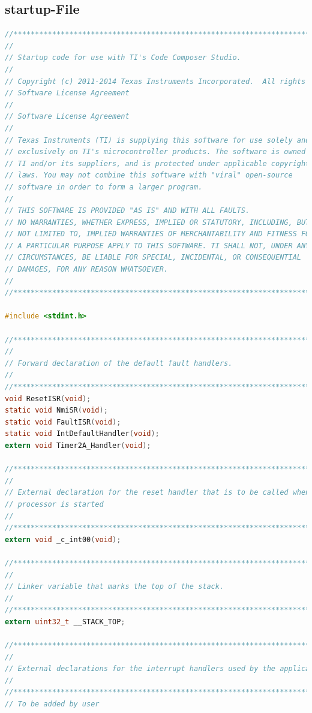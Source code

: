 \documentclass{article}
\begin{document}
\subsection*{startup-File}
\label{eq:zwei}
\begin{lstlisting}[language=c, caption={startup$\textunderscore$ccs.c}, captionpos=b]
//*****************************************************************************
//
// Startup code for use with TI's Code Composer Studio.
//
// Copyright (c) 2011-2014 Texas Instruments Incorporated.  All rights reserved.
// Software License Agreement
// 
// Software License Agreement
//
// Texas Instruments (TI) is supplying this software for use solely and
// exclusively on TI's microcontroller products. The software is owned by
// TI and/or its suppliers, and is protected under applicable copyright
// laws. You may not combine this software with "viral" open-source
// software in order to form a larger program.
//
// THIS SOFTWARE IS PROVIDED "AS IS" AND WITH ALL FAULTS.
// NO WARRANTIES, WHETHER EXPRESS, IMPLIED OR STATUTORY, INCLUDING, BUT
// NOT LIMITED TO, IMPLIED WARRANTIES OF MERCHANTABILITY AND FITNESS FOR
// A PARTICULAR PURPOSE APPLY TO THIS SOFTWARE. TI SHALL NOT, UNDER ANY
// CIRCUMSTANCES, BE LIABLE FOR SPECIAL, INCIDENTAL, OR CONSEQUENTIAL
// DAMAGES, FOR ANY REASON WHATSOEVER.
//
//*****************************************************************************

#include <stdint.h>

//*****************************************************************************
//
// Forward declaration of the default fault handlers.
//
//*****************************************************************************
void ResetISR(void);
static void NmiSR(void);
static void FaultISR(void);
static void IntDefaultHandler(void);
extern void Timer2A_Handler(void);

//*****************************************************************************
//
// External declaration for the reset handler that is to be called when the
// processor is started
//
//*****************************************************************************
extern void _c_int00(void);

//*****************************************************************************
//
// Linker variable that marks the top of the stack.
//
//*****************************************************************************
extern uint32_t __STACK_TOP;

//*****************************************************************************
//
// External declarations for the interrupt handlers used by the application.
//
//*****************************************************************************
// To be added by user


\end{lstlisting}
\end{document}
